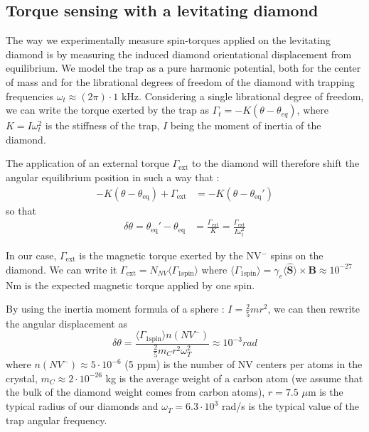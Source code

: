 \documentclass[preprintnumbers,amsmath,amssymb,onecolumn,12pt]{revtex4}
\begin{document}
\subsection{Torque sensing with a levitating diamond}

The way we experimentally measure spin-torques applied on the levitating diamond is by measuring the induced diamond orientational displacement from equilibrium. 
We model the trap as a pure harmonic potential, both for the center of mass and for the librational degrees of freedom of the diamond with trapping frequencies $\omega_t \approx (2\pi) \cdot 1$ kHz. Considering a single librational degree of freedom, we can write the torque exerted by the trap as $\Gamma_t=-K(\theta-\theta_{eq})$, where $K=I \omega_t^2$ is the stiffness of the trap, $I$ being the moment of inertia of the diamond.

The application of an external torque $\Gamma_{\mathrm{ext}}$ to the diamond will therefore shift the angular equilibrium position  in such a way that : 
\begin{align}
-K(\theta-\theta_{\mathrm{eq}}) + \Gamma_{\mathrm{ext}} &= -K(\theta-\theta_{\mathrm{eq}}') 
\end{align}
so that
\begin{align}
\delta\theta = \theta_{\mathrm{eq}}'-\theta_{\mathrm{eq}} &= \frac{\Gamma_{\mathrm{ext}}}{K}=\frac{\Gamma_{\mathrm{ext}}}{I \omega_t^2}
\end{align}

In our case, $\Gamma_{\mathrm{ext}}$ is the magnetic torque exerted by the NV$^-$ spins on the diamond. We can write it $\Gamma_{\mathrm{ext}} = N_{NV} \langle \Gamma_{\mathrm{1 spin}} \rangle$  where $\langle \Gamma_{\mathrm{1 spin}} \rangle = \gamma_e \langle\hat{\mathbf S}\rangle \times \mathbf B \approx 10^{-27}$ Nm is the expected magnetic torque applied by one spin.

By using the inertia moment formula of a sphere : $I=\frac{2}{5}m r^2$, we can then rewrite the angular displacement as $$ \delta\theta = \frac{\langle\Gamma_{\mathrm{1 spin}}\rangle n(NV^-)}{\frac{2}{5}m_Cr^2\omega_T^2} \approx 10^{-3} rad$$ where $n(NV^-) \approx 5 \cdot 10^{-6}$ (5 ppm) is the number of NV centers per atoms in the crystal, $m_C \approx 2 \cdot 10^{-26}$ kg is the average weight of a carbon atom (we assume that the bulk of the diamond weight comes from carbon atoms), $r= 7.5$ $\mu$m is the typical radius of our diamonds and $\omega_T = 6.3\cdot 10^3$ rad/s is the typical value of the trap angular frequency.
\end{document}
